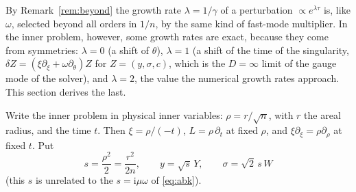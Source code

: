 \documentclass{amsart}
\numberwithin{equation}{section}
\theoremstyle{plain}
\theoremstyle{definition}
\theoremstyle{remark}
\newcommand{\iu}{\mathrm{i}}
\begin{document}
By Remark~\ref{rem:beyond} the growth rate $\lambda = 1/\gamma$ of a perturbation $\propto e^{\lambda\tau}$ is, like $\omega$,
selected beyond all orders in $1/n$, by the same kind of fast-mode multiplier. In the inner problem, however, some growth
rates are exact, because they come from symmetries: $\lambda = 0$ (a shift of $\theta$), $\lambda = 1$ (a shift of the time
of the singularity, $\delta Z = (\xi\partial_\xi + \omega\partial_\theta)Z$ for $Z = (y,\sigma,c)$, which is the $D = \infty$
limit of the gauge mode of the solver), and $\lambda = 2$, the value the numerical growth rates approach. This section
derives the last.

Write the inner problem in physical inner variables: $\rho = r/\sqrt n$, with $r$ the areal radius, and the time $t$.
Then $\xi = \rho/(-t)$, $L = \rho\,\partial_t$ at fixed $\rho$, and $\xi\partial_\xi = \rho\partial_\rho$ at fixed $t$. Put
\begin{equation}\label{eq:heatvars}
s = \frac{\rho^2}{2} = \frac{r^2}{2n},\qquad y = \sqrt s\,Y,\qquad \sigma = \sqrt2\,s\,W
\end{equation}
(this $s$ is unrelated to the $s = \iu\mu\omega$ of \eqref{eq:abk}).
\end{document}
